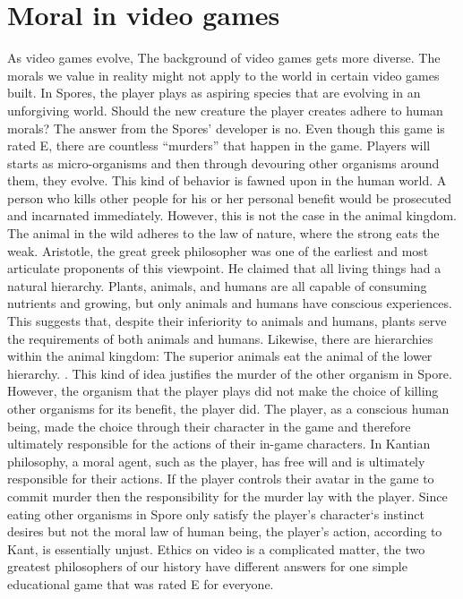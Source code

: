 \documentclass[10pt,twocolumn]{article}
\begin{document}
\section{Moral in video games}

 As video games evolve, The background of video games gets more diverse. The morals we value in reality might not apply to the world in certain video games built. In Spores, the player plays as aspiring species that are evolving in an unforgiving world. Should the new creature the player creates adhere to human morals? The answer from the Spores’ developer is no. Even though this game is rated E, there are countless “murders” that happen in the game. Players will starts as micro-organisms and then through devouring other organisms around them, they evolve. This kind of behavior is fawned upon in the human world. A person who kills other people for his or her personal benefit would be prosecuted and incarnated immediately. However, this is not the case in the animal kingdom. The animal in the wild adheres to the law of nature, where the strong eats the weak. Aristotle, the great greek philosopher was one of the earliest and most articulate proponents of this viewpoint. He claimed that all living things had a natural hierarchy. Plants, animals, and humans are all capable of consuming nutrients and growing, but only animals and humans have conscious experiences. This suggests that, despite their inferiority to animals and humans, plants serve the requirements of both animals and humans. Likewise, there are hierarchies within the animal kingdom: The superior animals eat the animal of the lower hierarchy. \cite{sep-moral-animal}. This kind of idea justifies the murder of the other organism in Spore. However, the organism that the player plays did not make the choice of killing other organisms for its benefit, the player did.
The player, as a conscious human being, made the choice through their character in the game and therefore ultimately responsible for the actions of their in-game characters.  In Kantian philosophy, a moral agent, such as the player, has free will and is ultimately responsible for their actions. If the player controls their avatar in the game to commit murder then the responsibility for the murder lay with the player. Since eating other organisms in Spore only satisfy the player’s character‘s instinct desires but not the moral law of human being, the player’s action, according to Kant, is essentially unjust.
Ethics on video is a complicated matter, the two greatest philosophers of our history have different answers for one simple educational game that was rated E for everyone. 
\end{document}
